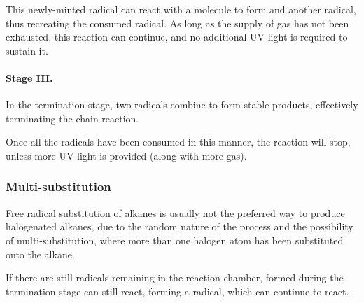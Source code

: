 					This newly-minted  radical can react with a  molecule to form  and another
					\ch{\Cl} radical, thus recreating the consumed radical. As long as the supply of  gas has
					not been exhausted, this reaction can continue, and no additional UV light is required to sustain it.


				\pagebreak
				\paragraph{Stage III.\hspace{5mm} }

					In the termination stage, two radicals combine to form stable products, effectively terminating the chain reaction.


					Once all the radicals have been consumed in this manner, the reaction will stop, unless more UV light is provided (along
					with more  gas).




			\subsubsection{Multi-substitution}

				Free radical substitution of alkanes is usually not the preferred way to produce
				halogenated alkanes, due to the random nature of the process and the possibility of multi-substitution,
				where more than one halogen atom has been substituted onto the alkane.

				If there are still \ch{\Cl} radicals remaining in the reaction chamber,  formed during the
				termination stage can still react, forming a  radical, which can continue to react.

